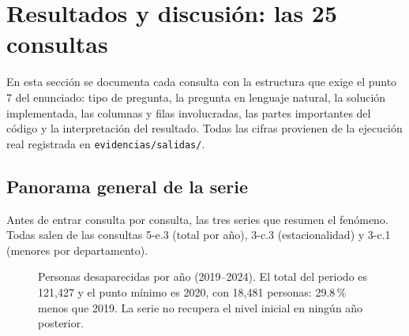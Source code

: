 \section{Resultados y discusi\'on: las 25 consultas}

En esta secci\'on se documenta cada consulta con la estructura que exige el punto 7 del
enunciado: tipo de pregunta, la pregunta en lenguaje natural, la soluci\'on implementada, las
columnas y filas involucradas, las partes importantes del c\'odigo y la interpretaci\'on del
resultado. Todas las cifras provienen de la ejecuci\'on real registrada en
\texttt{evidencias/salidas/}.

\subsection{Panorama general de la serie}
Antes de entrar consulta por consulta, las tres series que resumen el fen\'omeno. Todas salen de
las consultas 5-e.3 (total por a\~no), 3-c.3 (estacionalidad) y 3-c.1 (menores por departamento).

\begin{figure}[H]
\centering
{}
\caption{Personas desaparecidas por a\~no (2019--2024). El total del periodo es 121,427 y el
punto m\'inimo es 2020, con 18,481 personas: 29.8\,\% menos que 2019. La serie no recupera el
nivel inicial en ning\'un a\~no posterior.}
\label{fig:anual}
\end{figure}

